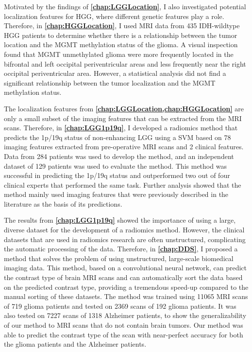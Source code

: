 Motivated by the findings of \textbf{\cref{chap:LGGLocation}}, I also investigated potential localization features for \gls{HGG}, where different genetic features play a role.
Therefore, in \textbf{\cref{chap:HGGLocation}}, I used \gls{MRI} data from 435 \gls{IDH}-wildtype \gls{HGG} patients to determine whether there is a relationship between the \gls{tumor} location and the \gls{MGMT} methylation status of the glioma.
A visual inspection found that \gls{MGMT} unmethylated glioma were more frequently located in the bifrontal and left occipital periventricular areas and less frequently near the right occipital periventricular area.
However, a statistical analysis did not find a significant relationship between the \gls{tumor} localization and the \gls{MGMT} methylation status.

The localization features from \textbf{\cref{chap:LGGLocation,chap:HGGLocation}} are only a small subset of the imaging features that can be extracted from the \gls{MRI} scans.
Therefore, in \textbf{\cref{chap:LGG1p19q}}, I developed a radiomics method that predicts the 1p/19q status of non-enhancing \gls{LGG} using a \gls{SVM} based on 78 imaging features extracted from pre-operative \gls{MRI} scans and 2 clinical features.
Data from 284 patients was used to develop the method, and an independent dataset of 129 patients was used to evaluate the method.
This method was successful in predicting the 1p/19q status and outperformed two out of four clinical experts that performed the same task.
Further analysis showed that the method mainly used imaging features that were previously described in the literature as the basis of its predictions.

The results from \textbf{\cref{chap:LGG1p19q}} showed the importance of using a large, diverse dataset for the development of a radiomics method.
However, the clinical datasets that are used in radiomics research are often unstructured, complicating the automatic processing of the data.
Therefore, in \textbf{\cref{chap:DDS}}, I proposed a method that solves the problem of using unstructured, large-scale biomedical imaging data.
This method, based on a convolutional neural network, can  predict the contrast type of brain \gls{MRI} scans and can automatically sort the data based on the predicted contrast type, providing a tremendous speed-up compared to the manual sorting of these datasets.
The method was trained using 11065 \gls{MRI} scans of 719 glioma patients and tested on 2369 scans of 192 glioma patients.
It was also tested on 7227 scans of 1318 Alzheimer patients, to show the generalizability of our method to \gls{MRI} scans that do not contain brain \glspl{tumor}.
Our method was able to predict the contrast type of the scan with near-perfect accuracy for both the glioma patients and the Alzheimer patients.

